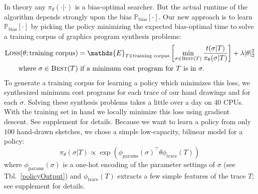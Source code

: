 \documentclass{article}
\newcommand{\expect}{\mathds{E}} %
\newcommand{\probability}{\mathds{P}} %
\begin{document}
In theory any $\pi_\theta(\cdot |\cdot ) $ is a bias-optimal searcher.
But the actual runtime of the algorithm depends strongly upon
the bias $\probability_{\text{bias}}[\cdot ]$.
Our new approach is to learn $\probability_{\text{bias}}[\cdot ]$
by picking the policy minimizing the
expected bias-optimal time to solve a training corpus of graphics program synthesis problems:
\begin{align}
\textsc{Loss}(\theta ; \text{training corpus})& =  \expect_{T\in \text{training corpus}}\left[ \min_{\sigma\in \text{\textsc{Best}}(T)}\frac{t(\sigma | T)}{\pi_\theta (\sigma | T)}\right] + \lambda |\theta|_2^2\label{policyLoss}\\
\text{where }  \sigma \in\text{\textsc{Best}}(T) &\text{ if  a minimum cost program for }T \text{ is in }\sigma .\nonumber %
\end{align}
To generate a training corpus for learning a policy which minimizes this loss,
we synthesized minimum cost programs for each trace of our hand drawings
and for each $\sigma $.
Solving these
synthesis problems takes a little over a day on 40 CPUs.
With the training set in hand we  %
 locally minimize this loss using gradient descent. %
See supplement for details.
Because we want to learn a policy from only $100$ hand-drawn sketches,
we chose a simple low-capacity, bilinear model for a policy:
\begin{equation}
  \pi_{\theta}(\sigma |T)\propto \exp \left( \phi_{\text{params}}(\sigma )^\top\theta \phi_{\text{trace}}(T)\right)
\end{equation}
where $\phi_{\text{params}}(\sigma  )$ is a one-hot encoding of
the parameter settings of $\sigma $ (see Tbl.~\ref{policyOutput})
and $\phi_{\text{trace}}(T)$ extracts a few simple features of the trace $T$;
see supplement for details.
\end{document}
